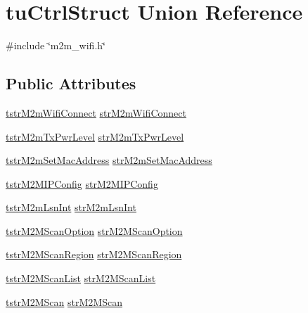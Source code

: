 \hypertarget{uniontuCtrlStruct}{}\section{tu\+Ctrl\+Struct Union Reference}
\label{uniontuCtrlStruct}


{\ttfamily \#include \char`\"{}m2m\+\_\+wifi.\+h\char`\"{}}

\subsection*{Public Attributes}
\begin{DoxyCompactItemize}
\item 
\hyperlink{structtstrM2mWifiConnect}{tstr\+M2m\+Wifi\+Connect} \hyperlink{group__WifiSetCustInfoElementFn_gad18e734993535e24d55c4c9c68ef5e9e}{str\+M2m\+Wifi\+Connect}
\item 
\hyperlink{structtstrM2mTxPwrLevel}{tstr\+M2m\+Tx\+Pwr\+Level} \hyperlink{group__WifiSetCustInfoElementFn_ga6e1c8bb535776890cc43768772bb355c}{str\+M2m\+Tx\+Pwr\+Level}
\item 
\hyperlink{structtstrM2mSetMacAddress}{tstr\+M2m\+Set\+Mac\+Address} \hyperlink{group__WifiSetCustInfoElementFn_ga998d3b618d2b3772da329489f07ed147}{str\+M2m\+Set\+Mac\+Address}
\item 
\hyperlink{structtstrM2MIPConfig}{tstr\+M2\+M\+I\+P\+Config} \hyperlink{group__WifiSetCustInfoElementFn_ga5a4fa5bbf6f826929f821d083629cabe}{str\+M2\+M\+I\+P\+Config}
\item 
\hyperlink{structtstrM2mLsnInt}{tstr\+M2m\+Lsn\+Int} \hyperlink{group__WifiSetCustInfoElementFn_gac81e96a254e43f3e6830cdd041fa27fe}{str\+M2m\+Lsn\+Int}
\item 
\hyperlink{structtstrM2MScanOption}{tstr\+M2\+M\+Scan\+Option} \hyperlink{group__WifiSetCustInfoElementFn_ga17a6de03099e43e155df470d334ef7c6}{str\+M2\+M\+Scan\+Option}
\item 
\hyperlink{structtstrM2MScanRegion}{tstr\+M2\+M\+Scan\+Region} \hyperlink{group__WifiSetCustInfoElementFn_gaf29f369330e8f80de5437187e43c6502}{str\+M2\+M\+Scan\+Region}
\item 
\hyperlink{structtstrM2MScanList}{tstr\+M2\+M\+Scan\+List} \hyperlink{group__WifiSetCustInfoElementFn_ga0307e0f160d77ae850197e3eca817b50}{str\+M2\+M\+Scan\+List}
\item 
\hyperlink{structtstrM2MScan}{tstr\+M2\+M\+Scan} \hyperlink{group__WifiSetCustInfoElementFn_gab615602d108737ff25c7032eda516730}{str\+M2\+M\+Scan}

\end{DoxyCompactItemize}
